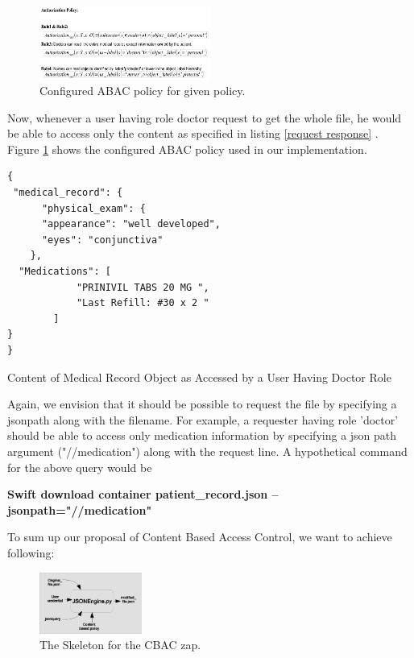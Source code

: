 \begin{figure}[h!]
  \centering
    \includegraphics[width=0.5\textwidth]{eps/policy}
 \caption{Configured ABAC policy for given policy.}
\label {fig:policy} 
\end{figure}


Now, whenever a user having role doctor request to get the whole file, he would be able to access only the content as specified in listing \ref{request response} . Figure \ref{fig:policy} shows the configured ABAC policy used in our implementation.

\begin{listing}
\begin{verbatim}
{
 "medical_record": { 
      "physical_exam": {
	  "appearance": "well developed",
	  "eyes": "conjunctiva"
	},
  "Medications": [
            "PRINIVIL TABS 20 MG ",
            "Last Refill: #30 x 2 "
        ]   
}  
}

\end{verbatim}
\caption{Content of  Medical Record Object as Accessed by a User Having Doctor Role} 
\label{request response}
\end{listing}


Again, we envision that it should  be possible to request the file by specifying a jsonpath along with the filename. For example, a requester having role 'doctor' should be able to access only   medication information by specifying a json path argument ("//medication") along with the request line. A hypothetical command for the above query would be 

\textbf{ Swift download container patient\_record.json --jsonpath="//medication" }


To sum up our proposal of Content Based Access Control, we want to achieve following:

\begin{figure}[h!] 
  \centering
    \includegraphics[width=0.3\textwidth]{eps/json_query_zap}
 \caption{The Skeleton for the CBAC zap.}
\label{fig:zappskeleton}
\end{figure}

